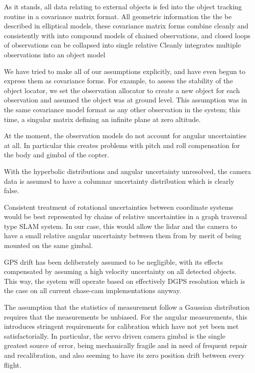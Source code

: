 \documentclass{article}
\begin{document}
      As it stands, all data relating to external objects is fed into the object tracking routine in a covariance matrix format.  
    All geometric information the the be described in elliptical models, these covariance matrix forms combine cleanly and consistently with 
     into compound models of chained observations, and closed loops of observations can be collapsed into single relative 
    Cleanly integrates multiple observations into an object model

    We have tried to make all of our assumptions explicitly, and have even begun to express them as covariance forms.
    For example, to assess the stability of the object locator, we set the observation allocator to create a new object for each observation and assumed the object was at ground level.  This assumption was in the same covariance model format as any other observation in the system; this time, a singular matrix defining an infinite plane at zero altitude.

    At the moment, the observation models do not account for angular uncertainties at all.  In particular this creates problems with pitch and roll compensation for the body and gimbal of the copter.

    With the hyperbolic distributions and angular uncertainty unresolved, the camera data is assumed to have a columnar uncertainty distribution which is clearly false. 

    Consistent treatment of rotational uncertainties between coordinate systems would be best represented by chains of relative uncertainties in a graph traversal type SLAM system.  In our case, this would allow the lidar and the camera to have a small relative angular uncertainty between them from by merit of being mounted on the same gimbal.

    GPS drift has been deliberately assumed to be negligible, with its effects compensated by assuming a high velocity uncertainty on all detected objects.  This way, the system will operate based on effectively DGPS resolution which is the case on all current chase-cam implementations anyway.

    The assumption that the statistics of measurement follow a Gaussian distribution requires that the measurements be unbiased.  For the angular measurements, this introduces stringent requirements for calibration which have not yet been met satisfactorially.  In particular, the servo driven camera gimbal is the single greatest source of error, being mechanically fragile and in need of frequent repair and recalibration, and also seeming to have its zero position drift between every flight.
\end{document}

